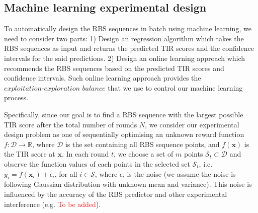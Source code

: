 \subsection{Machine learning experimental design}

To automatically design the RBS sequences in batch using machine learning, we need to consider two parts: 
1) Design an regression algorithm which takes the RBS sequences as input and returns the predicted TIR scores and the confidence intervals for the said predictions. 
2) Design an online learning approach which recommends the RBS sequences based on the predicted TIR scores and confidence intervals. 
Such online learning approach provides the $\textit{exploitation-exploration balance}$ that we use to control our machine learning process.

Specifically, since our goal is to find a RBS sequence with the largest possible TIR score after the total number of rounds $N$,  we consider our experimental design problem as one of sequentially optimising an unknown reward function $f: \mathcal{D} \rightarrow \mathbb{R}$, where $\mathcal{D}$ is the set containing all RBS sequence points, and $f(\mathbf{x})$ is the TIR score at $\mathbf{x}$. 
In each round $t$, we choose a set of $m$ points $\mathcal{S}_t \subset \mathcal{D}$ and observe the function values of each points in the selected set $\mathcal{S}_t$, i.e. $y_i = f(\mathbf{x}_i) + \epsilon_i$, for all $i \in \mathcal{S}$, where $\epsilon_i$ is the noise (we assume the noise is following Gaussian distribution with unknown mean and variance). This noise is influenced by the accuracy of the RBS predictor and other experimental interference (e.g. \textcolor{red}{To be added}). 


